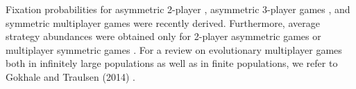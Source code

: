 \documentclass[11pt]{article}
\theoremstyle{plainCl1}
\theoremstyle{plainCl2}
\begin{document}
Fixation probabilities \cite{Fudenberg:TPB:2006} for asymmetric 2-player \cite{Sekiguchi:DGA:2017}, asymmetric 3-player games \cite{Sekiguchi:DGAA:2022}, and symmetric multiplayer games \cite{Kurokawa:PRSB:2009, gokhale:PNAS:2010} were recently derived. Furthermore, average strategy abundances \cite{antal:JTB:2009a, antal:JTB:2009b} were obtained only for 2-player asymmetric games \cite{Ohtsuki:JTB:2010, Sekiguchi:PA:2013} or multiplayer symmetric games \cite{gokhale:JTB:2011, Wu:Games:2013, Kroumi:JMB:2022}. For a review on evolutionary multiplayer games both in infinitely large populations as well as in finite populations, we refer to Gokhale and Traulsen (2014) \cite{Gokhale:DGAA:2014}.\\ 







\end{document}
